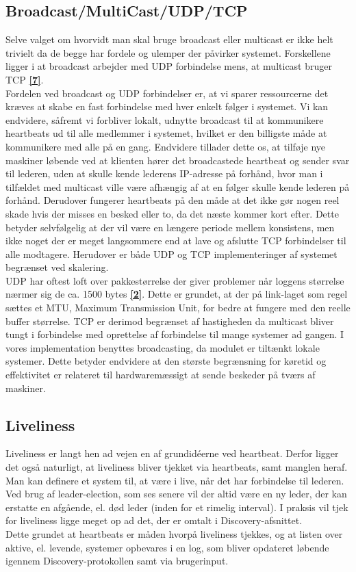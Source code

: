 \documentclass[a4paper,12pt]{article}
\begin{document}
\subsection{Broadcast/MultiCast/UDP/TCP}
Selve valget om hvorvidt man skal bruge broadcast eller multicast er ikke helt trivielt da de begge har fordele og ulemper der påvirker systemet. Forskellene ligger i at broadcast arbejder med UDP forbindelse mens, at multicast bruger TCP \hyperref[syv]{\textbf{[7]}}.
\\
Fordelen ved broadcast og UDP forbindelser er, at vi sparer ressourcerne det kræves at skabe en fast forbindelse med hver enkelt følger i systemet. Vi kan endvidere, såfremt vi forbliver lokalt, udnytte broadcast til at kommunikere heartbeats ud til alle medlemmer i systemet, hvilket er den billigste måde at kommunikere med alle på en gang. Endvidere tillader dette os, at tilføje nye maskiner løbende ved at klienten hører det broadcastede heartbeat og sender svar til lederen, uden at skulle kende lederens IP-adresse på forhånd, hvor man i tilfældet med multicast ville være afhængig af at en følger skulle kende lederen på forhånd. Derudover fungerer heartbeats på den måde at det ikke gør nogen reel skade hvis der misses en besked eller to, da det næste kommer kort efter. Dette betyder selvfølgelig at der vil være en længere periode mellem konsistens, men ikke noget der er meget langsommere end at lave og afslutte TCP forbindelser til alle modtagere.
Herudover er både UDP og TCP implementeringer af systemet begrænset ved skalering.
\\[5px]
UDP har oftest loft over pakkestørrelse der giver problemer når loggens størrelse nærmer sig de ca. 1500 bytes \hyperref[to]{\textbf{[2]}}. Dette er grundet, at der på link-laget som regel sættes et MTU, Maximum Transmission Unit, for bedre at fungere med den reelle buffer størrelse. TCP er derimod begrænset af hastigheden da multicast bliver tungt i forbindelse med oprettelse af forbindelse til mange systemer ad gangen. 
I vores implementation benyttes broadcasting, da modulet er tiltænkt lokale systemer.
Dette betyder endvidere at den største begrænsning for køretid og effektivitet er relateret til hardwaremæssigt at sende beskeder på tværs af maskiner.


\subsection{Liveliness} 
Liveliness er langt hen ad vejen en af grundidéerne ved heartbeat. Derfor ligger det også naturligt, at liveliness bliver tjekket via heartbeats, samt manglen heraf. Man kan definere et system til, at være i live, når det har forbindelse til lederen. Ved brug af leader-election, som ses senere vil der altid være en ny leder, der kan erstatte en afgående, el. død leder (inden for et rimelig interval). I praksis vil tjek for liveliness ligge meget op ad det, der er omtalt i Discovery-afsnittet.
\\
Dette grundet at heartbeats er måden hvorpå liveliness tjekkes, og at listen over aktive, el. levende, systemer opbevares i en log, som bliver opdateret løbende igennem Discovery-protokollen samt via brugerinput.
\end{document}
